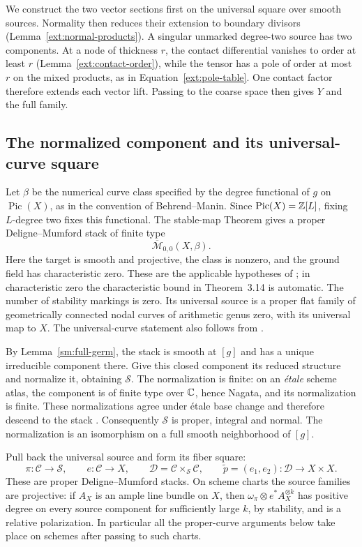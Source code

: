 We construct the two vector sections first on the universal square over
smooth sources. Normality then reduces their extension to boundary
divisors (Lemma~\ref{ext:normal-products}). A singular unmarked
degree-two source has two components. At a node of
thickness $r$, the contact differential vanishes to order at least $r$
(Lemma~\ref{ext:contact-order}), while the tensor has a pole of order at
most $r$ on the mixed products, as in Equation~\eqref{ext:pole-table}.
One contact factor therefore extends each vector lift. Passing to the coarse
space then gives $Y$ and the full family.

\subsection{The normalized component and its universal-curve square}

Let $\beta$ be the numerical curve class specified by the degree
functional of $g$ on $\operatorname{Pic}(X)$, as in the convention
of Behrend--Manin. Since $\operatorname{Pic}(X)=\mathbb Z[L]$, fixing
$L$-degree two fixes this functional. The stable-map
Theorem gives a proper Deligne--Mumford stack of finite type
\[
\overline{\mathcal M}_{0,0}(X,\beta).
\]
Here the target is smooth and projective, the class is nonzero, and the
ground field has characteristic zero. These are the applicable
hypotheses of \cite[Theorem~3.14 and Corollary~4.8]{BM1996}; in
characteristic zero the characteristic bound in Theorem~3.14 is
automatic. The number of stability markings is zero. Its universal
source is a proper flat family of geometrically connected nodal
curves of arithmetic genus zero, with its universal map to $X$.
The universal-curve statement also follows from
\cite[Corollary~4.6]{BM1996}.

By Lemma~\ref{sm:full-germ}, the stack is smooth at $[g]$ and has a
unique irreducible component there. Give this closed component its reduced structure and
normalize it, obtaining $\mathcal S$. The normalization is finite:
on an \emph{\'etale} scheme atlas, the component is of finite type over
$\mathbb C$, hence Nagata, and its normalization is finite. These
normalizations agree under \'etale base change and therefore descend
to the stack \cite[Tags , , and ]{Stacks}.
Consequently $\mathcal S$ is proper, integral and normal. The
normalization is an isomorphism on a full smooth neighborhood of
$[g]$.

Pull back the universal source and form its fiber square:
\begin{equation}\label{ext:universal}
\pi:\mathcal C\longrightarrow\mathcal S,\qquad
e:\mathcal C\longrightarrow X,\qquad
\mathcal D=\mathcal C\times_{\mathcal S}\mathcal C,
\qquad \widetilde p=(e_1,e_2):\mathcal D\longrightarrow X\times X.
\end{equation}
These are proper Deligne--Mumford stacks. On scheme charts the source
families are projective: if $A_X$ is an ample line bundle on $X$, then
$\omega_\pi\otimes e^*A_X^{\otimes k}$ has positive degree on every
source component for sufficiently large $k$, by stability, and is a
relative polarization. In particular all the proper-curve arguments
below take place on schemes after passing to such charts.

